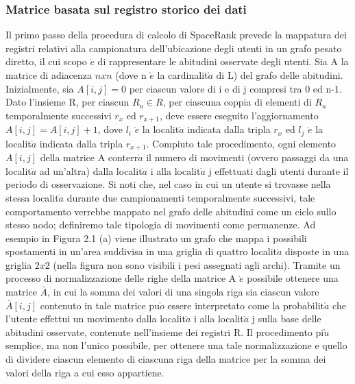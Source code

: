 \subsubsection{Matrice basata sul registro storico dei dati}
Il primo passo della procedura di calcolo di SpaceRank prevede la mappatura
dei registri relativi alla campionatura dell'ubicazione degli utenti in un grafo
pesato diretto, il cui scopo $\grave{e}$ di rappresentare le abitudini osservate degli utenti.
Sia A la matrice di adiacenza $n x n$ (dove n $\grave{e}$ la cardinalit$\grave{a}$ di L) del
grafo delle abitudini. Inizialmente, sia $A[i, j] = 0$ per ciascun valore di i e di
j compresi tra 0 ed n-1. Dato l'insieme R, per ciascun $R_{u} \in R$, per ciascuna
coppia di elementi di $R_{u}$ temporalmente successivi $r_{x}$ ed $r_{x+1}$, deve essere eseguito
l'aggiornamento $A[i, j] = A[i, j] + 1$, dove $l_{i}$ $\grave{e}$ la localit$\grave{a}$ indicata dalla
tripla $r_{x}$ ed $l_{j}$ $\grave{e}$ la localit$\grave{a}$ indicata dalla tripla $r_{x+1}$. Compiuto tale procedimento,
ogni elemento $A[i, j]$ della matrice A conterr$\grave{a}$ il numero di movimenti
(ovvero passaggi da una localit$\grave{a}$ ad un'altra) dalla localit$\grave{a}$ i alla localit$\grave{a}$ j effettuati
dagli utenti durante il periodo di osservazione. Si noti che, nel caso
in cui un utente si trovasse nella stessa localit$\grave{a}$ durante due campionamenti
temporalmente successivi, tale comportamento verrebbe mappato nel grafo
delle abitudini come un ciclo sullo stesso nodo; definiremo tale tipologia di
movimenti come permanenze.
Ad esempio in Figura 2.1 (a) viene illustrato un grafo che mappa i possibili
spostamenti in un'area suddivisa in una griglia di quattro localit$\grave{a}$ disposte in
una griglia $2 x 2$ (nella figura non sono visibili i pesi assegnati agli archi).
Tramite un processo di normalizzazione delle righe della matrice A $\grave{e}$ possibile
ottenere una matrice $\bar{A}$, in cui la somma dei valori di una singola riga sia
ciascun valore $\bar{A}[i, j]$ contenuto in tale matrice pu$\grave{o}$ essere interpretato come
la probabilit$\grave{a}$ che l'utente effettui un movimento dalla localit$\grave{a}$ i alla localit$\grave{a}$
j sulla base delle abitudini osservate, contenute nell'insieme dei registri R. Il
procedimento pi$\grave{u}$ semplice, ma non l'unico possibile, per ottenere una tale
normalizzazione e quello di dividere ciascun elemento di ciascuna riga della
matrice per la somma dei valori della riga a cui esso appartiene.

